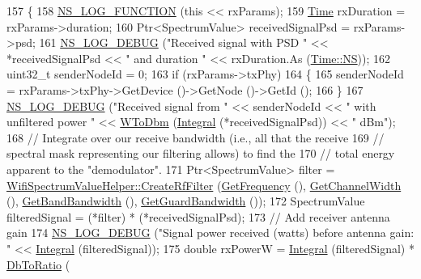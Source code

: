 \begin{DoxyCode}
157 \{
158   \hyperlink{log-macros-disabled_8h_a90b90d5bad1f39cb1b64923ea94c0761}{NS\_LOG\_FUNCTION} (\textcolor{keyword}{this} << rxParams);
159   \hyperlink{namespacens3_1_1TracedValueCallback_a7ffd3e7c142ffe7c8a1d2db9b8de38ec}{Time} rxDuration = rxParams->duration;
160   Ptr<SpectrumValue> receivedSignalPsd = rxParams->psd;
161   \hyperlink{group__logging_ga413f1886406d49f59a6a0a89b77b4d0a}{NS\_LOG\_DEBUG} (\textcolor{stringliteral}{"Received signal with PSD "} << *receivedSignalPsd << \textcolor{stringliteral}{" and duration "} << 
      rxDuration.As (\hyperlink{classns3_1_1Time_a87a7f4d29c68b047a72d291ad660295aae324232af1b8cf625cecd92a22e0f2dc}{Time::NS}));
162   uint32\_t senderNodeId = 0;
163   \textcolor{keywordflow}{if} (rxParams->txPhy)
164     \{
165       senderNodeId = rxParams->txPhy->GetDevice ()->GetNode ()->GetId ();
166     \}
167   \hyperlink{group__logging_ga413f1886406d49f59a6a0a89b77b4d0a}{NS\_LOG\_DEBUG} (\textcolor{stringliteral}{"Received signal from "} << senderNodeId << \textcolor{stringliteral}{" with unfiltered power "} << 
      \hyperlink{namespacens3_a256abf4ba6bab6e20f8419fff00e73e2}{WToDbm} (\hyperlink{namespacens3_a3dd3817567502f8bc77b04e47134c070}{Integral} (*receivedSignalPsd)) << \textcolor{stringliteral}{" dBm"});
168   \textcolor{comment}{// Integrate over our receive bandwidth (i.e., all that the receive}
169   \textcolor{comment}{// spectral mask representing our filtering allows) to find the}
170   \textcolor{comment}{// total energy apparent to the "demodulator".}
171   Ptr<SpectrumValue> filter = \hyperlink{classns3_1_1WifiSpectrumValueHelper_a1d613cc1d50378be01db8b715928c8d1}{WifiSpectrumValueHelper::CreateRfFilter}
       (\hyperlink{classns3_1_1WifiPhy_ad2508d94faf22d690d6b8b4367934fd1}{GetFrequency} (), \hyperlink{classns3_1_1WifiPhy_a4a5d5009b3b3308f2baeed42a2007189}{GetChannelWidth} (), 
      \hyperlink{classns3_1_1SpectrumWifiPhy_a2028d03c5fa0c7683ea23c6ada450d84}{GetBandBandwidth} (), \hyperlink{classns3_1_1SpectrumWifiPhy_a5a24b5d646d3968cf4678a814156edfe}{GetGuardBandwidth} ());
172   SpectrumValue filteredSignal = (*filter) * (*receivedSignalPsd);
173   \textcolor{comment}{// Add receiver antenna gain}
174   \hyperlink{group__logging_ga413f1886406d49f59a6a0a89b77b4d0a}{NS\_LOG\_DEBUG} (\textcolor{stringliteral}{"Signal power received (watts) before antenna gain: "} << 
      \hyperlink{namespacens3_a3dd3817567502f8bc77b04e47134c070}{Integral} (filteredSignal));
175   \textcolor{keywordtype}{double} rxPowerW = \hyperlink{namespacens3_a3dd3817567502f8bc77b04e47134c070}{Integral} (filteredSignal) * \hyperlink{namespacens3_a9bcb737f8802285d6bf0581ce1812afd}{DbToRatio} (

\end{DoxyCode}
